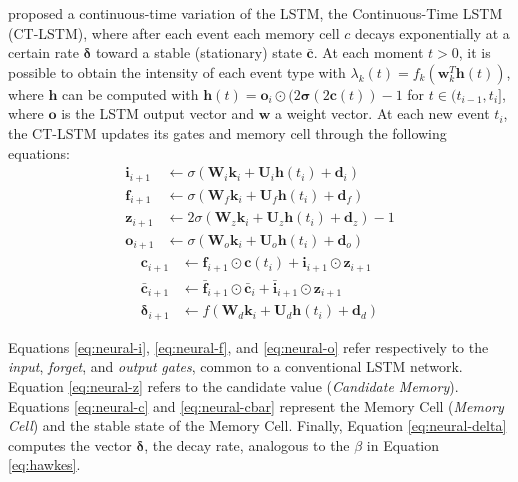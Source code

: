      proposed a continuous-time variation of the \gls{LSTM}, the Continuous-Time LSTM (CT-LSTM), where after each event each memory cell $c$ decays exponentially at a certain rate $\mathbf{\delta}$ toward a stable (stationary) state $\mathbf{\bar{c}}$. At each moment $t>0$, it is possible to obtain the intensity of each event type with $\lambda_k(t)=f_k(\mathbf{w}_k^T\mathbf{h}(t))$, where $\mathbf{h}$ can be computed with $\mathbf{h}(t)=\mathbf{o}_i \odot (2\mathbf{\sigma}(2\mathbf{c}(t))-1$ for $t \in (t_{i-1},t_i]$, where $\mathbf{o}$ is the LSTM output vector and $\mathbf{w}$ a weight vector. At each new event $t_i$, the CT-LSTM updates its gates and memory cell through the following equations:
    \begin{align}
        \mathbf{i}_{i+1} &\leftarrow \sigma(\mathbf{W}_i \mathbf{k}_i+\mathbf{U}_i \mathbf{h}(t_i)+\mathbf{d}_i) \label{eq:neural-i} \\
        \mathbf{f}_{i+1} &\leftarrow \sigma(\mathbf{W}_f \mathbf{k}_i+\mathbf{U}_f \mathbf{h}(t_i)+\mathbf{d}_f) \label{eq:neural-f} \\
        \mathbf{z}_{i+1} &\leftarrow 2\sigma(\mathbf{W}_z \mathbf{k}_i+\mathbf{U}_z \mathbf{h}(t_i)+\mathbf{d}_z) - 1 \label{eq:neural-z} \\
        \mathbf{o}_{i+1} &\leftarrow \sigma(\mathbf{W}_o \mathbf{k}_i+\mathbf{U}_o \mathbf{h}(t_i)+\mathbf{d}_o) \label{eq:neural-o}
    \end{align}
    \begin{align}
        \mathbf{c}_{i+1} &\leftarrow \mathbf{f}_{i+1} \odot \mathbf{c}(t_i)+\mathbf{i}_{i+1} \odot \mathbf{z}_{i+1} \label{eq:neural-c} \\
        \mathbf{\bar{c}}_{i+1} &\leftarrow \mathbf{\bar{f}}_{i+1} \odot \mathbf{\bar{c}}_i+\mathbf{\bar{i}}_{i+1} \odot \mathbf{z}_{i+1} \label{eq:neural-cbar} \\
        \mathbf{\delta}_{i+1} &\leftarrow f(\mathbf{W}_d \mathbf{k}_i+\mathbf{U}_d \mathbf{h}(t_i)+\mathbf{d}_d) \label{eq:neural-delta}
    \end{align}

    Equations \ref{eq:neural-i}, \ref{eq:neural-f}, and \ref{eq:neural-o} refer respectively to the \textit{input}, \textit{forget}, and \textit{output} \textit{gates}, common to a conventional LSTM network. Equation \ref{eq:neural-z} refers to the candidate value (\textit{Candidate Memory}). Equations \ref{eq:neural-c} and \ref{eq:neural-cbar} represent the Memory Cell (\textit{Memory Cell}) and the stable state of the Memory Cell. Finally, Equation \ref{eq:neural-delta} computes the vector $\mathbf{\delta}$, the decay rate, analogous to the $\beta$ in Equation \ref{eq:hawkes}.

